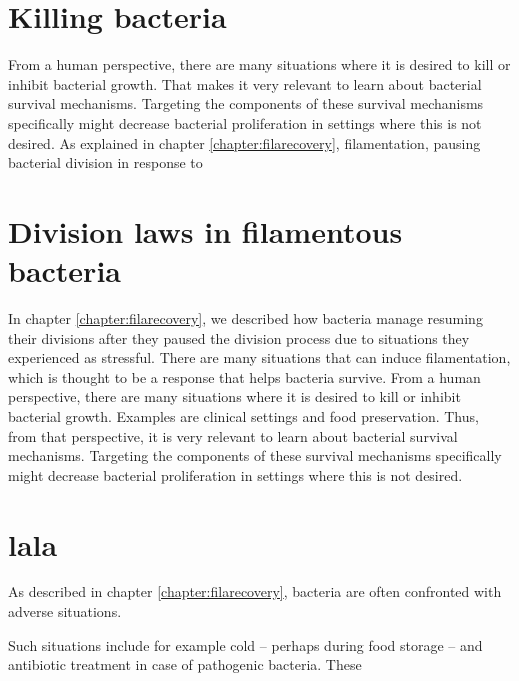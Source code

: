 

\section{Killing bacteria}

From a human perspective, there are many situations where it is desired to kill or inhibit bacterial growth.
%
That makes it very relevant to learn about bacterial survival mechanisms.
%
Targeting the components of these survival mechanisms specifically might 
decrease bacterial proliferation in settings where this is not desired.
%
As explained in chapter \ref{chapter:filarecovery},
filamentation, pausing bacterial division in response to 
%



\section{Division laws in filamentous bacteria}

In chapter \ref{chapter:filarecovery}, we described how bacteria manage resuming their divisions after they 
paused the division process due to situations they experienced as stressful.
%
There are many situations that can induce filamentation,
which is thought to be a response that helps bacteria survive.
%
From a human perspective, there are many situations where it is desired to kill or inhibit bacterial growth.
Examples are clinical settings and food preservation.
%
Thus, from that perspective, it is very relevant to learn about bacterial survival mechanisms.
%
Targeting the components of these survival mechanisms specifically might 
decrease bacterial proliferation in settings where this is not desired.



\section{lala}



As described in chapter \ref{chapter:filarecovery}, bacteria are often confronted with adverse situations.
%


Such situations include for example cold -- perhaps during food storage -- and antibiotic treatment in case of pathogenic bacteria.
%
These 